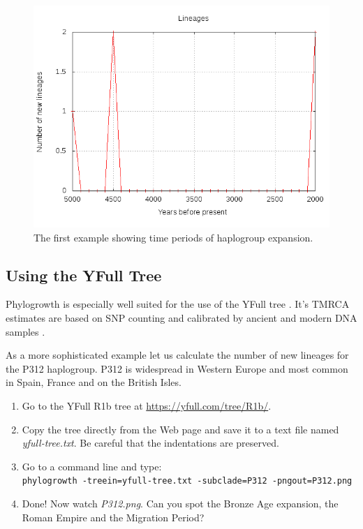 \begin{figure}[ht]
\centering
\includegraphics[width=13cm]{img/example.png}
\caption{The first example showing time periods of haplogroup
expansion.}
\end{figure}

\pagebreak


\subsection{Using the YFull Tree}

Phylogrowth is especially well suited for the use of the YFull
tree \cite{YFullTree}. It's TMRCA estimates are based on SNP
counting and calibrated by ancient and modern DNA samples
\cite{YFullMutationRate}.

As a more sophisticated example let us calculate the number of
new lineages for the P312 haplogroup. P312 is widespread in Western
Europe and most common in Spain, France and on the British Isles.

\begin{enumerate}
\item Go to the YFull R1b tree at
	\href{https://yfull.com/tree/R1b/}{https://yfull.com/tree/R1b/}.
\item Copy the tree directly from the Web page and save it
	to a text file named \emph{yfull-tree.txt}.
	Be careful that the indentations are preserved.
\item Go to a command line and type:\\
	\texttt{phylogrowth -treein=yfull-tree.txt -subclade=P312 -pngout=P312.png}
\item Done! Now watch \emph{P312.png}. Can you spot the Bronze Age
	expansion, the Roman Empire and the Migration Period?
\end{enumerate}


